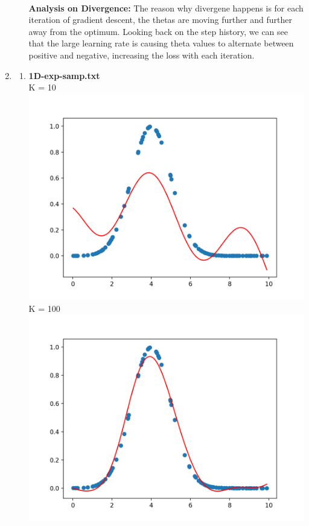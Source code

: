 \documentclass[12pt]{article}
\newcommand{\nextproblem}{
	\vfill
	\pagebreak
}
\begin{document}
\begin{enumerate}
\begin{enumerate}
	\\ \textbf{Analysis on Divergence:} The reason why divergene happens is for each iteration of gradient descent, the thetas are moving further and further away from the optimum. Looking back on the step history, we can see that the large learning rate is causing theta values to alternate between positive and negative, increasing the loss with each iteration. 
\end{enumerate}
\nextproblem
\item
\begin{enumerate}
	\item \textbf{1D-exp-samp.txt}
	\\ K = 10
	\\ \includegraphics[height=0.3\textheight]{1Dexpsamp10}
	\\ K = 100
	\\ \includegraphics[height=0.3\textheight]{1Dexpsamp100}

\end{enumerate}
\end{enumerate}
\end{document}
